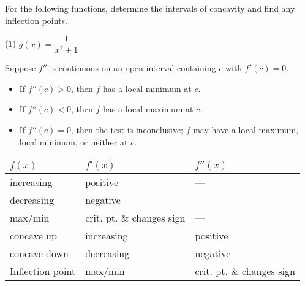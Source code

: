 \documentclass[../mathNotesPreamble]{subfiles}
\begin{document}
  \begin{ex*}
    For the following functions, determine the intervals of concavity and find any inflection points.
  \end{ex*}
  \pagebreak

  \begin{extasks}[after-item-skip=\stretch{1}](1)
    \task $g(x)=\dfrac{1}{x^2+1}$
  \end{extasks}
  \pagebreak

  \begin{thmBox*}
    Suppose $f''$ is continuous on an open interval containing $c$ with $f'(c)=0$.
    \begin{itemize}
      \item If $f''(c)>0$, then $f$ has a local minimum at $c$.
      \item If $f''(c)<0$, then $f$ has a local maximum at $c$.
      \item If $f''(c)=0$, then the test is inconclusive; $f$ may have a local maximum, local minimum, or neither at $c$.
    \end{itemize}
  \end{thmBox*}
  \pagebreak

  \begin{center}
    \begin{tabularx}{0.95\linewidth}{*{3}{X}}\toprule
      $f(x)$& $f'(x)$& $f''(x)$\\\midrule
      increasing& positive& ---\\
      decreasing& negative& ---\\
      max/min& crit. pt. \& changes sign& ---\\
      concave up& increasing& positive\\
      concave down& decreasing& negative\\
      Inflection point& max/min& crit. pt. \& changes sign\\\bottomrule
    \end{tabularx}
  \end{center}
  \pagebreak
\end{document}
